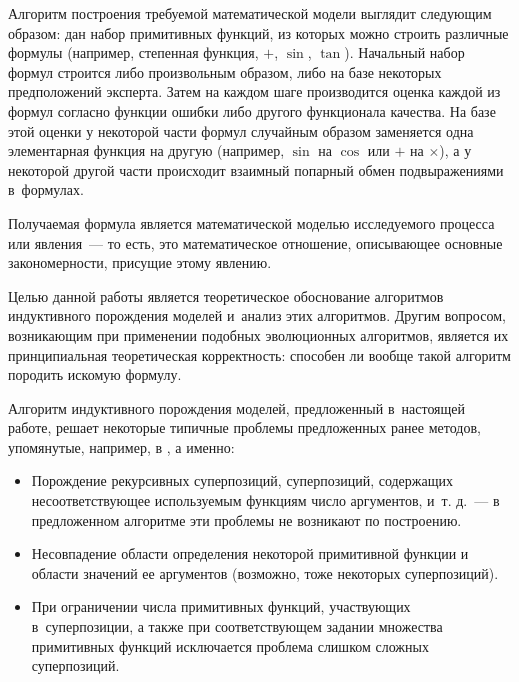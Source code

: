 \documentclass[12pt,a4paper]{amsart}
\begin{document}
Алгоритм построения требуемой математической модели выглядит следующим образом:
дан набор примитивных функций, из которых можно строить различные формулы
(например, степенная функция, $+$, $\sin$, $\tan$). Начальный набор формул
строится либо произвольным образом, либо на базе некоторых предположений
эксперта. Затем на каждом шаге производится оценка каждой из формул согласно
функции ошибки либо другого функционала \cite{Tirsin2005} качества. На базе
этой оценки у некоторой части формул случайным образом заменяется одна
элементарная функция на другую (например, $\sin$ на $\cos$ или $+$ на
$\times$), а у некоторой другой части происходит взаимный попарный обмен
подвыражениями в~формулах.

Получаемая формула является математической моделью \cite{Pavlovsky2000}
исследуемого процесса или явления~--- то есть, это математическое отношение,
описывающее основные закономерности, присущие этому явлению.


Целью данной работы является теоретическое обоснование алгоритмов индуктивного
порождения моделей и~анализ этих алгоритмов. Другим вопросом, возникающим при
применении подобных эволюционных алгоритмов, является их принципиальная
теоретическая корректность: способен ли вообще такой алгоритм породить искомую
формулу.

Алгоритм индуктивного порождения моделей, предложенный в~настоящей работе, решает
некоторые типичные проблемы предложенных ранее методов, упомянутые, например,
в \cite{Zelinka2008}, а именно:
\begin{itemize}
  \item Порождение рекурсивных суперпозиций, суперпозиций, содержащих
	несоответствующее используемым функциям число аргументов, и~т. д.~--- в
	предложенном алгоритме эти проблемы не возникают по построению.
  \item Несовпадение области определения некоторой примитивной функции и области
	значений ее аргументов (возможно, тоже некоторых суперпозиций).
  \item При ограничении числа примитивных функций, участвующих в~суперпозиции,
	а также при соответствующем задании множества примитивных функций
	исключается проблема слишком сложных суперпозиций.
\end{itemize}
\end{document}
